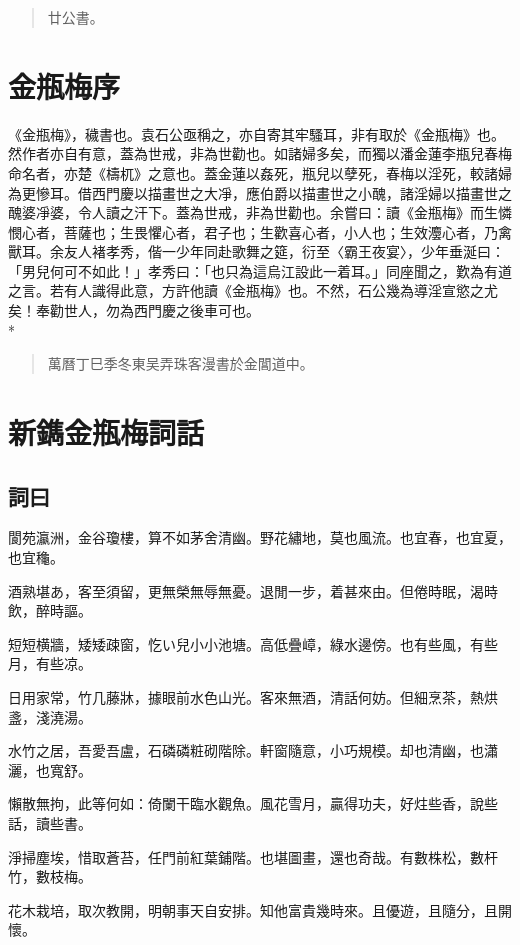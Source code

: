 \begin{quotation}\begin{flushright}廿公書。\end{flushright}\end{quotation}

\chapter*{金瓶梅序}
\thispagestyle{empty}

《金瓶梅》，穢書也。袁石公亟稱之，亦自寄其牢騷耳，非有取於《金瓶梅》也。然作者亦自有意，蓋為世戒，非為世勸也。如諸婦多矣，而獨以潘金蓮李瓶兒春梅命名者，亦楚《檮杌》之意也。蓋金蓮以姦死，瓶兒以孽死，春梅以淫死，較諸婦為更慘耳。借西門慶以描畫世之大凈，應伯爵以描畫世之小醜，諸淫婦以描畫世之醜婆凈婆，令人讀之汗下。蓋為世戒，非為世勸也。余嘗曰：讀《金瓶梅》而生憐憫心者，菩薩也；生畏懼心者，君子也；生歡喜心者，小人也；生效灋心者，乃禽獸耳。余友人褚孝秀，偕一少年同赴歌舞之筵，衍至〈霸王夜宴〉，少年垂涎曰：「男兒何可不如此！」孝秀曰：「也只為這烏江設此一着耳。」同座聞之，歎為有道之言。若有人識得此意，方許他讀《金瓶梅》也。不然，石公幾為導淫宣慾之尤矣！奉勸世人，勿為西門慶之後車可也。\\*

\begin{quotation}\begin{flushright}萬曆丁巳季冬東吴弄珠客漫書於金閶道中。\end{flushright}\end{quotation}

\chapter*{新鐫金瓶梅詞話}
\thispagestyle{empty}

\section*{詞曰}

\begin{myquote0}
閬苑瀛洲，金谷瓊樓，算不如茅舍清幽。野花繡地，莫也風流。也宜春，也宜夏，也宜龝。

酒熟堪あ，客至須留，更無榮無辱無憂。退閒一步，着甚來由。但倦時眠，渴時飲，醉時謳。

短短横牆，矮矮疎窗，忔い兒小小池塘。高低疊嶂，綠水邊傍。也有些風，有些月，有些凉。

日用家常，竹几藤牀，據眼前水色山光。客來無酒，清話何妨。但細烹茶，熱烘盞，淺澆湯。

水竹之居，吾愛吾盧，石磷磷粧砌階除。軒窗隨意，小巧規模。却也清幽，也瀟灑，也寬舒。

懶散無拘，此等何如：倚闌干臨水觀魚。風花雪月，贏得功夫，好炷些香，說些話，讀些書。

淨掃塵埃，惜取蒼苔，任門前紅葉鋪階。也堪圖畫，還也奇哉。有數株松，數杆竹，數枝梅。

花木栽培，取次教開，明朝事天自安排。知他富貴幾時來。且優遊，且隨分，且開懷。
\end{myquote0}

